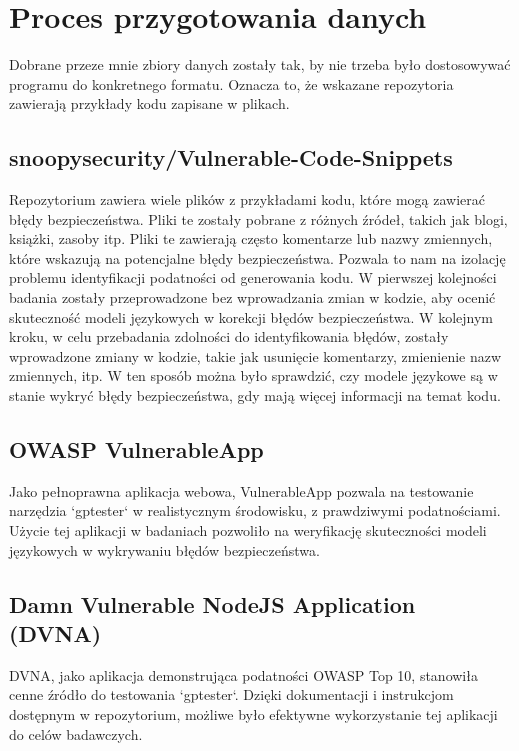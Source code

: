 \section{Proces przygotowania danych}
\label{sec:proces_przygotowania_danych}

Dobrane przeze mnie zbiory danych zostały tak, by nie trzeba było dostosowywać programu do konkretnego formatu. Oznacza to, że wskazane repozytoria zawierają przykłady kodu zapisane w plikach.

\subsection{snoopysecurity/Vulnerable-Code-Snippets} 
Repozytorium zawiera wiele plików z przykładami kodu, które mogą zawierać błędy bezpieczeństwa. Pliki te zostały pobrane z różnych źródeł, takich jak blogi, książki, zasoby itp. Pliki te zawierają często komentarze lub nazwy zmiennych, które wskazują na potencjalne błędy bezpieczeństwa. Pozwala to nam na izolację problemu identyfikacji podatności od generowania kodu. W pierwszej kolejności badania zostały przeprowadzone bez wprowadzania zmian w kodzie, aby ocenić skuteczność modeli językowych w korekcji błędów bezpieczeństwa. W kolejnym kroku, w celu przebadania zdolności do identyfikowania błędów, zostały wprowadzone zmiany w kodzie, takie jak usunięcie komentarzy, zmienienie nazw zmiennych, itp. W ten sposób można było sprawdzić, czy modele językowe są w stanie wykryć błędy bezpieczeństwa, gdy mają więcej informacji na temat kodu.


\subsection{OWASP VulnerableApp}
Jako pełnoprawna aplikacja webowa, VulnerableApp pozwala na testowanie narzędzia `gptester` w realistycznym środowisku, z prawdziwymi podatnościami. Użycie tej aplikacji w badaniach pozwoliło na weryfikację skuteczności modeli językowych w wykrywaniu błędów bezpieczeństwa.

\subsection{Damn Vulnerable NodeJS Application (DVNA)}
DVNA, jako aplikacja demonstrująca podatności OWASP Top 10, stanowiła cenne źródło do testowania `gptester`. Dzięki dokumentacji i instrukcjom dostępnym w repozytorium, możliwe było efektywne wykorzystanie tej aplikacji do celów badawczych.

